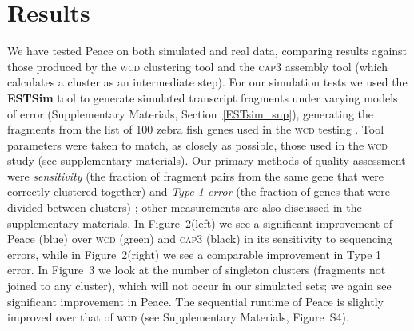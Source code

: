 \documentclass[a4,center,fleqn]{NAR}
\newcommand{\wcd}{\textsc{wcd }}
\newcommand{\capthree}{\textsc{cap3 }}
\begin{document}
\section{Results}

We have tested {\sc Peace} on both simulated and real data,
comparing results against those produced by the \wcd
clustering tool \cite{Hazelhurst08a} and the \capthree assembly
tool \cite{Huang99} (which calculates a cluster as an intermediate
step).  For our simulation tests we used the {\bf ESTSim} tool
\cite{Hazelhurst03} to generate simulated transcript fragments under varying models
of error (Supplementary Materials, Section~\ref{ESTsim_sup}),
generating the fragments from the list of 100 zebra fish genes used in
the \wcd testing \cite{Hazelhurst08a}.  Tool parameters were
taken to match, as closely as possible, those used in the \wcd
study (see supplementary materials).  Our primary methods of quality
assessment were {\it sensitivity} (the fraction of fragment pairs from the
same gene that were correctly clustered together) and {\it Type 1
  error} (the fraction of genes that were divided between clusters)
\cite{Wang04,Hazelhurst08a}; other measurements are also discussed
in the supplementary materials.  In Figure~2(left) we see a
significant improvement of {\sc Peace} (blue) over \wcd
(green) and \capthree (black) in its sensitivity to sequencing
errors, while in Figure~2(right) we see a comparable
improvement in Type 1 error.  In Figure~3 we look at
the number of singleton clusters (fragments not joined to any cluster),
which will not occur in our simulated sets; we again see significant
improvement in {\sc Peace}.  The sequential runtime of
{\sc Peace} is slightly improved over that of \wcd (see
Supplementary Materials, Figure~S4).
\end{document}
